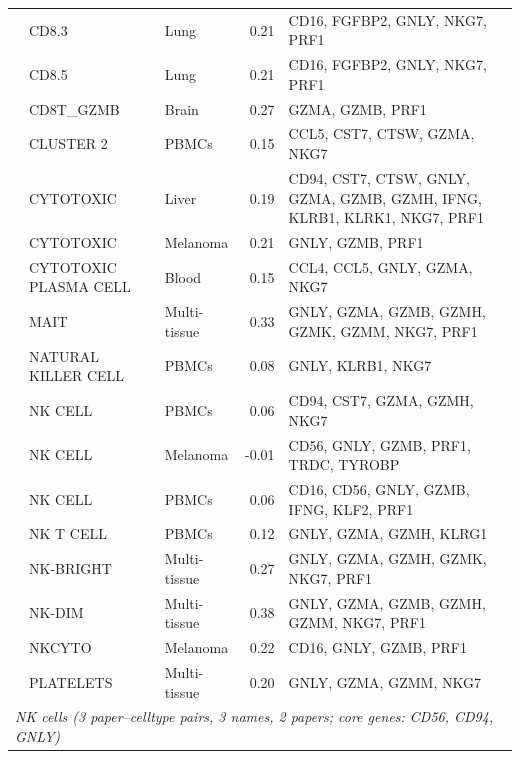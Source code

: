 \documentclass[10pt,twocolumn]{article}
\theoremstyle{plain}
\theoremstyle{definition}
\theoremstyle{remark}
\begin{document}
\begin{table}[ht!]
\begin{tabular}{@{}l l l r p{5.2cm}@{}}
  \citep{Yoffe2025}          & CD8.3                   & Lung      & 0.21 & CD16, FGFBP2, GNLY, NKG7, PRF1\\
  \citep{Yoffe2025}          & CD8.5                   & Lung      & 0.21 & CD16, FGFBP2, GNLY, NKG7, PRF1\\
  \citep{Cheng2024glio}      & CD8T\_GZMB              & Brain     & 0.27 & GZMA, GZMB, PRF1\\
  \citep{Heydari2021}        & CLUSTER 2               & PBMCs     & 0.15 & CCL5, CST7, CTSW, GZMA, NKG7\\
  \citep{Ma2020}             & CYTOTOXIC               & Liver     & 0.19 & CD94, CST7, CTSW, GNLY, GZMA, GZMB, GZMH, IFNG, KLRB1, KLRK1, NKG7, PRF1\\
  \citep{Landeloos2023}      & CYTOTOXIC               & Melanoma  & 0.21 & GNLY, GZMB, PRF1\\
  \citep{Zhong2021myeloma}   & CYTOTOXIC PLASMA CELL   & Blood     & 0.15 & CCL4, CCL5, GNLY, GZMA, NKG7\\
  \citep{Turiello2025}       & MAIT                    & Multi-tissue & 0.33 & GNLY, GZMA, GZMB, GZMH, GZMK, GZMM, NKG7, PRF1\\
  \citep{Imoto2025}          & NATURAL KILLER CELL     & PBMCs     & 0.08 & GNLY, KLRB1, NKG7\\
  \citep{Wang2020celda}      & NK CELL                 & PBMCs     & 0.06 & CD94, CST7, GZMA, GZMH, NKG7\\
  \citep{Landeloos2023}      & NK CELL                 & Melanoma  & -0.01 & CD56, GNLY, GZMB, PRF1, TRDC, TYROBP\\
  \citep{Lawlor2020}         & NK CELL                 & PBMCs     & 0.06 & CD16, CD56, GNLY, GZMB, IFNG, KLF2, PRF1\\
  \citep{Wang2020celda}      & NK T CELL               & PBMCs     & 0.12 & GNLY, GZMA, GZMH, KLRG1\\
  \citep{Turiello2025}       & NK-BRIGHT               & Multi-tissue & 0.27 & GNLY, GZMA, GZMH, GZMK, NKG7, PRF1\\
  \citep{Turiello2025}       & NK-DIM                  & Multi-tissue & 0.38 & GNLY, GZMA, GZMB, GZMH, GZMM, NKG7, PRF1\\
  \citep{Landeloos2023}      & NKCYTO                  & Melanoma  & 0.22 & CD16, GNLY, GZMB, PRF1\\
  \citep{Turiello2025}       & PLATELETS               & Multi-tissue & 0.20 & GNLY, GZMA, GZMM, NKG7\\
  \midrule
  \multicolumn{5}{l}{\textit{NK cells (3 paper--celltype pairs, 3 names, 2 papers; core genes: CD56, CD94, GNLY)}} \\[2pt]

\end{tabular}
\end{table}
\end{document}
